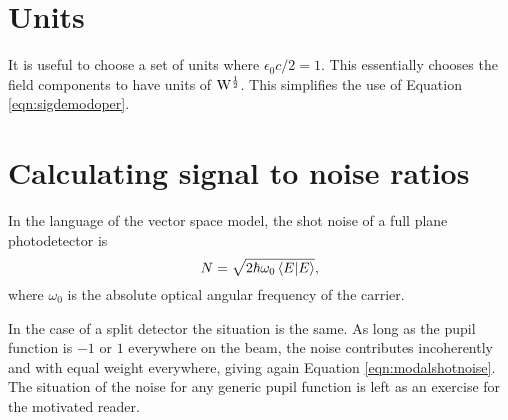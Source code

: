 \section{Units}
It is useful to choose a set of units where $\epsilon_0 c/2=1$. %
This essentially chooses the field components to have units of $\rm{W}^{\frac{1}{2}}$. %
This simplifies the use of Equation \ref{eqn:sigdemodoper}.

\section{Calculating signal to noise ratios}
In the language of the vector space model, the shot noise of a full plane photodetector is 
\begin{equation}
\label{eqn:modalshotnoise}
N=\sqrt{2\hbar \omega_0 \inprod{E}{E}},
\end{equation}
where $\omega_0$ is the absolute optical angular frequency of the carrier.

In the case of a split detector the situation is the same. %
As long as the pupil function is $-1$ or $1$ everywhere on the beam, the noise contributes incoherently and with equal weight everywhere, giving again Equation \ref{eqn:modalshotnoise}. %
The situation of the noise for any generic pupil function is left as an exercise for the motivated reader.
